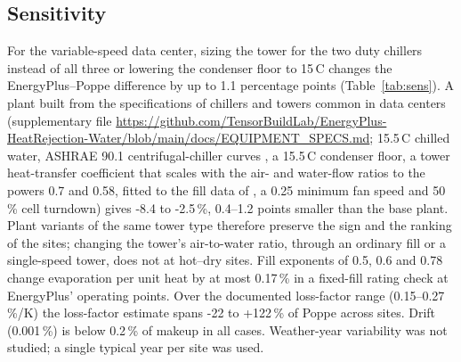 \documentclass[preprint,12pt]{elsarticle}
\begin{document}
\subsection{Sensitivity}\label{sec:sensitivity}
For the variable-speed data center, sizing the tower for the two duty chillers instead of all three or lowering the condenser floor to
15\,\textdegree C changes the EnergyPlus--Poppe difference by up to 1.1 percentage points (Table~\ref{tab:sens}). A plant
built from the specifications of chillers and towers common in data centers (supplementary file \url{https://github.com/TensorBuildLab/EnergyPlus-HeatRejection-Water/blob/main/docs/EQUIPMENT_SPECS.md};
15.5\,\textdegree C chilled water, ASHRAE 90.1 centrifugal-chiller curves \citep{ashrae2019addendumbd}, a 15.5\,\textdegree C
condenser floor, a tower heat-transfer coefficient that scales with the air- and water-flow ratios to the powers 0.7 and
0.58, fitted to the fill data of \citet{kloppers2003critical}, a 0.25 minimum
fan speed and 50\,\% cell turndown) gives -8.4 to -2.5\,\%, 0.4--1.2 points smaller than the base plant. Plant variants of
the same tower type therefore preserve the sign and the ranking of the sites; changing the tower's air-to-water ratio,
through an ordinary fill or a single-speed tower, does not at hot--dry sites. Fill exponents of 0.5, 0.6 and 0.78 change
evaporation per unit heat by at most 0.17\,\% in a fixed-fill rating check at EnergyPlus' operating points. Over the
documented loss-factor range (0.15--0.27\,\%/K) the loss-factor estimate spans -22 to +122\,\% of Poppe across sites. Drift
(0.001\,\%) is below 0.2\,\% of makeup in all cases. Weather-year variability was not studied; a single typical year per site
was used.
\end{document}
